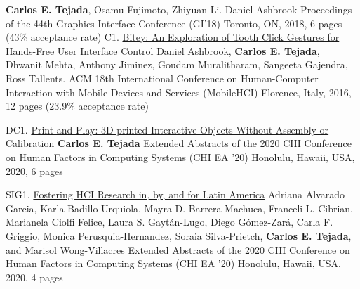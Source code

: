 \begin{cvpublications}
        {\textbf{Carlos E. Tejada}, Osamu Fujimoto, Zhiyuan Li. Daniel Ashbrook}%
        {Proceedings of the 44th Graphics Interface Conference (GI’18)}%
        {Toronto, ON, 2018, 6 pages (43\% acceptance rate)}
      \cvpublication%
        {C1.}%
        {\href{https://doi.org/10.1145/2935334.2935389}{Bitey: An Exploration of Tooth Click Gestures for Hands-Free User Interface Control}}%
        {Daniel Ashbrook, \textbf{Carlos E. Tejada}, Dhwanit Mehta, Anthony Jiminez, Goudam Muralitharam, Sangeeta Gajendra, Ross Tallents.}%
        {ACM 18th International Conference on Human-Computer Interaction with Mobile Devices and Services (MobileHCI)}%
        {Florence, Italy, 2016, 12 pages (23.9\% acceptance rate)}
    \end{cvpublications}

    \begin{cvpublications}
      \cvpublication%
        {DC1.}%
        {\href{https://doi.org/10.1145/3334480.3375025}{Print-and-Play: 3D-printed Interactive Objects Without Assembly or Calibration}}%
        {\textbf{Carlos E. Tejada}}%
        {Extended Abstracts of the 2020 CHI Conference on Human Factors in Computing Systems (CHI EA ’20)}%
        {Honolulu, Hawaii, USA, 2020, 6 pages}
    \end{cvpublications}

    \begin{cvpublications}
      \cvpublication%
        {SIG1.}%
        {\href{https://doi.org/10.1145/3334480.3381055}{Fostering HCI Research in, by, and for Latin America}}%
        {Adriana Alvarado Garcia, Karla Badillo-Urquiola, Mayra D. Barrera Machuca, Franceli L. Cibrian, Marianela Ciolfi Felice, Laura S. Gaytán-Lugo, Diego Gómez-Zará, Carla F. Griggio, Monica Perusquia-Hernandez, Soraia Silva-Prietch, \textbf{Carlos E. Tejada}, and Marisol Wong-Villacres}%
        {Extended Abstracts of the 2020 CHI Conference on Human Factors in Computing Systems (CHI EA ’20)}%
        {Honolulu, Hawaii, USA, 2020, 4 pages}
    \end{cvpublications}

